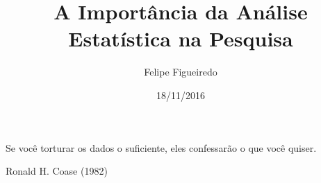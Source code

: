 \documentclass{beamer}
\title[Estatística na Pesquisa] %
{A Importância da Análise Estatística na Pesquisa}
\subtitle
{} %
\author%
{Felipe Figueiredo}%
\institute[INTO] %
{Mestrado Profissional em Ciências Aplicadas ao Sistema Musculoesquelético\\
Instituto Nacional de Traumatologia e Ortopedia Jamil Haddad
}
\date%
{18/11/2016}
\begin{document}
\begin{frame}
  \titlepage
\end{frame}









\begin{frame}{}
  \begin{block}{}
    Se você torturar os dados o suficiente, eles confessarão o que você quiser.
  \end{block}
\hfill Ronald H. Coase (1982)
\end{frame}
\end{document}
